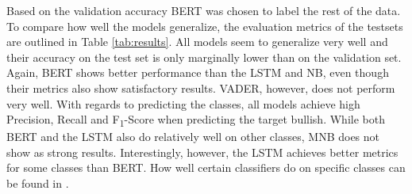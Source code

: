 \documentclass[11pt, a4paper]{article}
\begin{document}
Based on the validation accuracy BERT was chosen to label the rest of the data.
To compare how well the models generalize, the evaluation metrics of the testsets are outlined in Table \ref{tab:results}.
All models seem to generalize very well and their accuracy on the test set is only marginally lower than on the validation set.
Again, BERT shows better performance than the LSTM and NB, even though their metrics also show satisfactory results.
VADER, however, does not perform very well.
With regards to predicting the classes, all models achieve high Precision, Recall and F\textsubscript{1}-Score when predicting the target bullish.
While both BERT and the LSTM also do relatively well on other classes, MNB does not show as strong results. Interestingly, however, the LSTM achieves better metrics
for some classes than BERT.
How well certain classifiers do on specific classes can be found in .

\begin{table}[!ht]
    \caption{Test Set Macro Average Evaluation Metrics Models}
    \label{tab:results}
    \centering
    \small
\end{table}
\newpage
\end{document}
